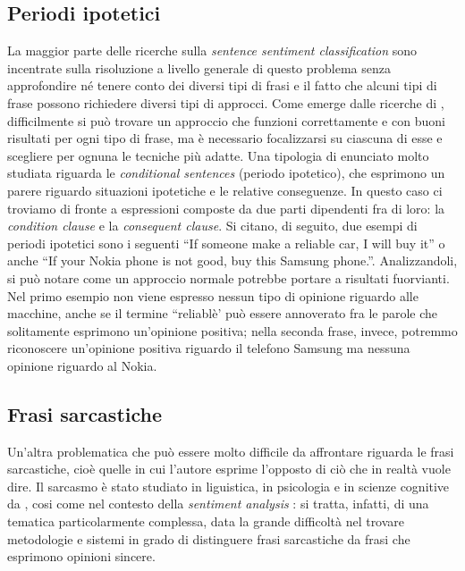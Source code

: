 \documentclass[a4paper,12pt,openright,twoside]{report}
\theoremstyle{definition}
\begin{document}
\subsection{Periodi ipotetici}
La maggior parte delle ricerche sulla \emph{sentence sentiment classification}
sono incentrate sulla risoluzione a livello generale di questo problema senza 
approfondire né tenere conto
dei diversi tipi di frasi e il fatto che alcuni tipi di frase possono richiedere diversi tipi di
 approcci.
Come emerge dalle ricerche di \cite{Narayan2009},
difficilmente si può trovare un approccio che funzioni correttamente e con buoni risultati
per ogni tipo di frase, ma è necessario focalizzarsi su ciascuna di esse e scegliere per ognuna le tecniche più adatte.
Una tipologia di enunciato molto studiata riguarda le \emph{conditional sentences} (periodo ipotetico),
che esprimono un parere riguardo situazioni ipotetiche e le relative conseguenze. 
In questo caso ci troviamo di fronte a espressioni composte
da due parti
dipendenti fra di loro: la \emph{condition clause} e la \emph{consequent clause}.
Si citano, di seguito, due esempi di periodi ipotetici sono i seguenti ``If someone make a reliable car, I will buy it'' o anche 
``If your Nokia phone is not good, buy this Samsung phone.''.
Analizzandoli, si può notare come
un approccio normale potrebbe portare a risultati fuorvianti. Nel primo esempio non 
viene espresso nessun
tipo di opinione riguardo alle macchine, anche se il termine ``reliablè' può essere
annoverato fra le parole
che solitamente esprimono un'opinione positiva; nella seconda frase, invece, 
potremmo riconoscere
un'opinione positiva riguardo il telefono Samsung ma nessuna opinione riguardo al Nokia.

\subsection{Frasi sarcastiche}
Un'altra problematica che può essere molto difficile da affrontare  riguarda le frasi sarcastiche, cioè quelle in cui l’autore esprime l'opposto di ciò che in realtà vuole dire.
Il sarcasmo è stato studiato in liguistica, in psicologia e in scienze cognitive da 
\citep{Gibbs1986, Gibbs2007, Kreuz2007, Kreuz1989, Utsumi2000},
cosi come nel contesto della \emph{sentiment analysis}
\citep{Gonzales2011}:
 si tratta, infatti, di una tematica particolarmente complessa, 
data la grande difficoltà nel trovare metodologie e 
sistemi in grado di distinguere frasi sarcastiche 
da frasi che  esprimono opinioni sincere.
\end{document}
